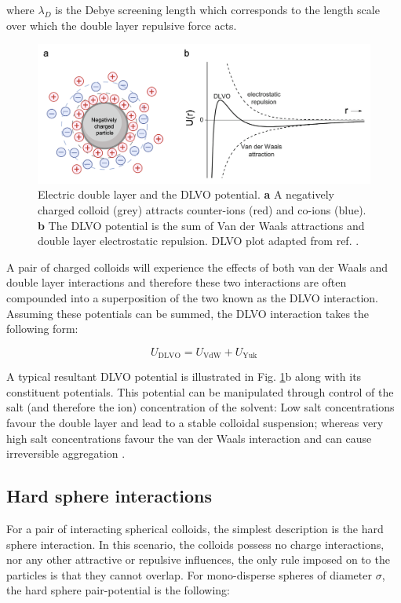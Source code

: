 \noindent where $\lambda_D$ is the Debye screening length which corresponds to the length scale over which the double layer repulsive force acts. 

\begin{figure}
	\includegraphics[width=\linewidth]{chapters/colloids/figsColloids/figDLVO.png}
	\caption[Electric double layer and the DLVO potential.]{Electric double layer and the DLVO potential. \textbf{a} A negatively charged colloid (grey) attracts counter-ions (red) and co-ions (blue). \textbf{b} The DLVO potential is the sum of Van der Waals attractions and double layer electrostatic repulsion. DLVO plot adapted from ref. \cite{lekkerkerker2011}.}
	\label{fig:DLVO}
\end{figure}

A pair of charged colloids will experience the effects of both van der Waals and double layer interactions and therefore these two interactions are often compounded into a superposition of the two known as the DLVO interaction. Assuming these potentials can be summed, the DLVO interaction takes the following form:

\begin{equation}
	U_{\textrm{DLVO}} = U_{\textrm{VdW}} + U_{\textrm{Yuk}}
\end{equation}

\noindent A typical resultant DLVO potential is illustrated in Fig. \ref{fig:DLVO}b along with its constituent potentials. This potential can be manipulated through control of the salt (and therefore the ion) concentration of the solvent: Low salt concentrations favour the double layer and lead to a stable colloidal suspension; whereas very high salt concentrations favour the van der Waals interaction and can cause irreversible aggregation \cite{lekkerkerker2011}.

\subsection{Hard sphere interactions}
\label{section:HardSpheres}
For a pair of interacting spherical colloids, the simplest description is the hard sphere interaction. In this scenario, the colloids possess no charge interactions, nor any other attractive or repulsive influences, the only rule imposed on to the particles is that they cannot overlap. For mono-disperse spheres of diameter $\sigma$, the hard sphere pair-potential is the following:


